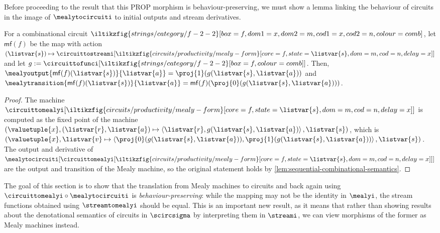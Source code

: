 \documentclass{lmcs}
\begin{document}
Before proceeding to the result that this PROP morphism is behaviour-preserving,
we must show a lemma linking the behaviour of circuits in the image of
\(\mealytocircuiti\) to initial outputs and stream derivatives.

\begin{prop}
    \label{prop:mealy-form-image}
    For a combinational circuit \(
    \iltikzfig{strings/category/f-2-2}[box=f,dom1=x,dom2=m,cod1=x,cod2=n,colour=comb]
    \), let \(\mathsf{mf}(f)\) be the map with action \(
    (\listvar{s}) \mapsto
    \circuittostreami[
        \iltikzfig{circuits/productivity/mealy-form}[core=f,state=\listvar{s},dom=m,cod=n,delay=x]
    ]
    \) and let \(
    g
    :=
    \circuittofunci[
        \iltikzfig{strings/category/f-2-2}[box=f,colour=comb]
    ]
    \).
    Then, \(
    \mealyoutput{\mathsf{mf}(f)(\listvar{s})}{\listvar{a}}
    =
    \proj{1}(g(\listvar{s}, \listvar{a}))
    \) and \(
    \mealytransition{\mathsf{mf}(f)(\listvar{s})}{\listvar{a}}
    =
    \mathsf{mf}(f)(\proj{0}(g(\listvar{s}, \listvar{a})))
    \).
\end{prop}
\begin{proof}
    The machine \(\circuittomealyi[
        \iltikzfig{circuits/productivity/mealy-form}[core=f,state=\listvar{s},dom=m,cod=n,delay=x]
    ]\) is computed as the fixed point of the machine \(
    \left(\valuetuple{x},
    (\listvar{r}, \listvar{a}) \mapsto \left\langle
    \listvar{r}, g(\listvar{s}, \listvar{a})
    \right\rangle, \listvar{s}\right)
    \), which is \(
    \left(\valuetuple{x},
    \listvar{v} \mapsto \left\langle
    \proj{0}\mleft(g(\listvar{s},\listvar{a})\mright),
    \proj{1}\mleft(g(\listvar{s}, \listvar{a})\mright)
    \right\rangle, \listvar{s}\right)
    \).
    The output and derivative of \(
    \mealytocircuiti[
        \circuittomealyi[
            \iltikzfig{circuits/productivity/mealy-form}[core=f,state=\listvar{s},dom=m,cod=n,delay=x]
        ]
    ]
    \) are the output and transition of the Mealy machine, so the original
    statement holds by \autoref{lem:sequential-combinational-semantics}.
\end{proof}

The goal of this section is to show that the translation from Mealy machines to
circuits and back again using \(\circuittomealyi \circ \mealytocircuiti\) is
\emph{behaviour-preserving}: while the mapping may not be the identity in
\(\mealyi\), the stream functions obtained using \(\streamtomealyi\) should
be equal.
This is an important new result, as it means that rather than showing
results about the denotational semantics of circuits in \(\scircsigma\) by
interpreting them in \(\streami\), we can view morphisms of the former as
Mealy machines instead.
\end{document}
